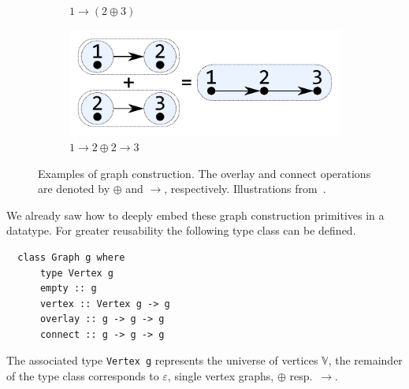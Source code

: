 \documentclass{article}
\newcommand{\hs}{\texttt}
\renewcommand{\epsilon}{\varepsilon}
\newcommand{\eps}{\epsilon}
\newcommand{\overlay}{\oplus}
\newcommand{\connect}{\rightarrow}
\begin{document}
\begin{figure}
\begin{subfigure}[b]{0.3\linewidth}
    \vspace{-1mm}
    \caption{$1 \connect (2 \overlay 3)$}
  \end{subfigure}
  \hspace{3mm}
  \begin{subfigure}[b]{0.3\linewidth}
    \centerline{\includegraphics[scale=0.27]{fig/ex-e-new.pdf}}
    \vspace{-1mm}
    \caption{$1 \connect 2 \overlay 2 \connect 3$}
  \end{subfigure}
  \caption{Examples of graph construction. The overlay and connect operations
    are denoted by $\overlay$ and $\connect$, respectively. Illustrations
    from~\cite{mokhov2017algebraic}.\label{fig:construction}} 
\end{figure}

We already saw how to deeply embed these graph construction primitives in a
datatype. For greater reusability the following type class can be defined.
\begin{verbatim}
  class Graph g where
      type Vertex g
      empty :: g
      vertex :: Vertex g -> g
      overlay :: g -> g -> g
      connect :: g -> g -> g
\end{verbatim}
The associated type \hs{Vertex g} represents the universe of vertices
$\mathbb{V}$, the remainder of the type class corresponds to $\eps$, single
vertex graphs, $\overlay$ resp.\ $\connect$.
\end{document}
